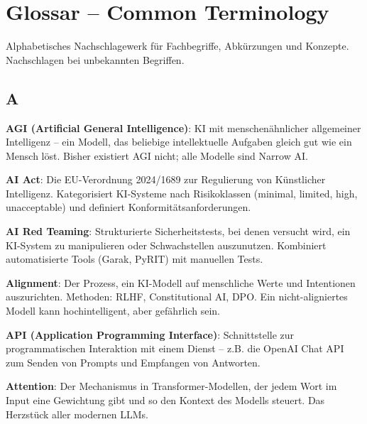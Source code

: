 \chapter{Glossar -- Common Terminology}
\label{chap:glossar}




\par\mbox{}\par
\begin{lernzieleEnv}
Alphabetisches Nachschlagewerk für Fachbegriffe, Abkürzungen und Konzepte. Nachschlagen bei unbekannten Begriffen.
\end{lernzieleEnv}

\section{A}

\textbf{AGI (Artificial General Intelligence)}\hspace{0pt}: KI mit menschenähnlicher allgemeiner Intelligenz -- ein Modell, das beliebige intellektuelle Aufgaben gleich gut wie ein Mensch löst. Bisher existiert AGI nicht; alle Modelle sind Narrow AI.

\textbf{AI Act}\hspace{0pt}: Die EU-Verordnung 2024/1689 zur Regulierung von Künstlicher Intelligenz. Kategorisiert KI-Systeme nach Risikoklassen (minimal, limited, high, unacceptable) und definiert Konformitätsanforderungen.

\textbf{AI Red Teaming}\hspace{0pt}: Strukturierte Sicherheitstests, bei denen versucht wird, ein KI-System zu manipulieren oder Schwachstellen auszunutzen. Kombiniert automatisierte Tools (Garak, PyRIT) mit manuellen Tests.

\textbf{Alignment}\hspace{0pt}: Der Prozess, ein KI-Modell auf menschliche Werte und Intentionen auszurichten. Methoden: RLHF, Constitutional AI, DPO. Ein nicht-aligniertes Modell kann hochintelligent, aber gefährlich sein.

\textbf{API (Application Programming Interface)}\hspace{0pt}: Schnittstelle zur programmatischen Interaktion mit einem Dienst -- z.B. die OpenAI Chat API zum Senden von Prompts und Empfangen von Antworten.

\textbf{Attention}\hspace{0pt}: Der Mechanismus in Transformer-Modellen, der jedem Wort im Input eine Gewichtung gibt und so den Kontext des Modells steuert. Das Herzstück aller modernen LLMs.

